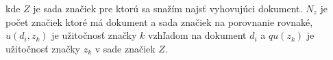 kde \(Z\) je sada značiek pre ktorú sa snažím najsť vyhovujúci dokument. \(N_z\) je počet značiek
ktoré má dokument a sada značiek na porovnanie rovnaké, \(u(d_i, z_k)\) je užitočnosť značky
\(k\) vzhľadom na dokument \(d_i\) a \(qu(z_k)\) je užitočnosť značky \(z_k\) v sade značiek
\(Z\).

%
%
%
%

